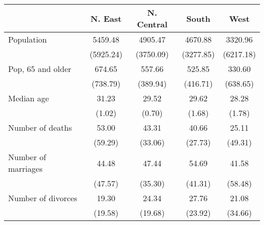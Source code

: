 \begin{tabular}{l*{4}{c}}
\toprule
                &  N. East&N. Central&    South&     West\\
\midrule
Population      &  5459.48&  4905.47&  4670.88&  3320.96\\
                &(5925.24)&(3750.09)&(3277.85)&(6217.18)\\
\addlinespace
Pop, 65 and older&   674.65&   557.66&   525.85&   330.60\\
                & (738.79)& (389.94)& (416.71)& (638.65)\\
\addlinespace
Median age      &    31.23&    29.52&    29.62&    28.28\\
                &   (1.02)&   (0.70)&   (1.68)&   (1.78)\\
\addlinespace
Number of deaths&    53.00&    43.31&    40.66&    25.11\\
                &  (59.29)&  (33.06)&  (27.73)&  (49.31)\\
\addlinespace
Number of marriages&    44.48&    47.44&    54.69&    41.58\\
                &  (47.57)&  (35.30)&  (41.31)&  (58.48)\\
\addlinespace
Number of divorces&    19.30&    24.34&    27.76&    21.08\\
                &  (19.58)&  (19.68)&  (23.92)&  (34.66)\\
\bottomrule
\end{tabular}
